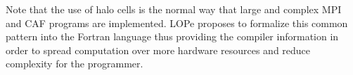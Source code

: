 





Note that the use of halo cells is the normal way that large and complex MPI and CAF
programs are implemented.  LOPe proposes to formalize this common pattern into the Fortran
language thus providing the compiler information in order to spread computation over more
hardware resources and reduce complexity for the programmer.
